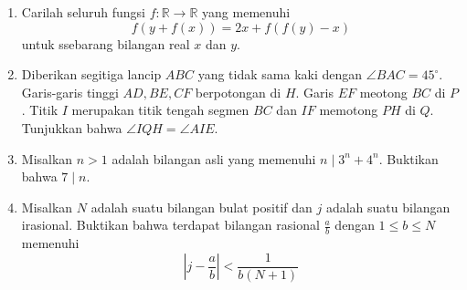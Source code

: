 \documentclass{article}
\begin{document}
\begin{enumerate}[resume]
	\item Carilah seluruh fungsi $f:\mathbb{R}\rightarrow\mathbb{R}$ yang memenuhi
	$$f(y+f(x))=2x+f(f(y)-x)$$ untuk ssebarang bilangan real $x$ dan $y$.
	
	\item Diberikan segitiga lancip $ABC$ yang tidak sama kaki dengan $\angle BAC = 45^\circ$. Garis-garis tinggi $AD,BE,CF$ berpotongan di $H$. Garis $EF$ meotong $BC$ di $P$. Titik $I$ merupakan titik tengah segmen $BC$ dan $IF$ memotong $PH$ di $Q$. Tunjukkan bahwa $\angle IQH = \angle AIE$.
	
	\item Misalkan $n > 1$ adalah bilangan asli yang memenuhi $n \mid 3^n+4^n$. Buktikan bahwa $7 \mid n$.
	
	\item Misalkan $N$ adalah suatu bilangan bulat positif dan $j$ adalah suatu bilangan irasional. Buktikan bahwa terdapat bilangan rasional $\frac{a}{b}$ dengan $1 \le b \le N$ memenuhi $$\left | j-\frac{a}{b} \right | < \frac{1}{b(N+1)}$$
\end{enumerate}
\end{document}
